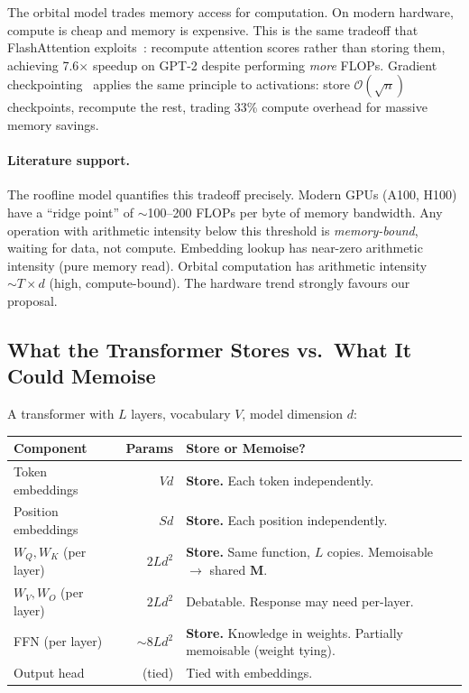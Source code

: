 \documentclass[11pt, a4paper]{article}
\newcommand{\M}{\mathbf{M}}
\theoremstyle{remark}
\begin{document}
The orbital model trades memory access for computation.
On modern hardware, compute is cheap and memory is expensive.
This is the same tradeoff that FlashAttention exploits~\cite{dao2022flashattention}: recompute attention scores rather than storing them, achieving 7.6$\times$ speedup on GPT-2 despite performing \emph{more} FLOPs.
Gradient checkpointing~\cite{chen2016sublinear} applies the same principle to activations: store $\mathcal{O}(\sqrt{n})$ checkpoints, recompute the rest, trading 33\% compute overhead for massive memory savings.

\paragraph{Literature support.}
The roofline model quantifies this tradeoff precisely.
Modern GPUs (A100, H100) have a ``ridge point'' of $\sim$100--200 FLOPs per byte of memory bandwidth.
Any operation with arithmetic intensity below this threshold is \emph{memory-bound}, waiting for data, not compute.
Embedding lookup has near-zero arithmetic intensity (pure memory read).
Orbital computation has arithmetic intensity $\sim T \times d$ (high, compute-bound).
The hardware trend strongly favours our proposal.

\subsection{What the Transformer Stores vs.\ What It Could Memoise}

A transformer with $L$ layers, vocabulary $V$, model dimension $d$:

\begin{center}\small
\begin{tabular}{@{}p{4.5cm}rp{6cm}@{}}
\toprule
\textbf{Component} & \textbf{Params} & \textbf{Store or Memoise?} \\
\midrule
Token embeddings & $Vd$ & \textbf{Store.} Each token independently. \\
Position embeddings & $Sd$ & \textbf{Store.} Each position independently. \\
$W_Q, W_K$ (per layer) & $2Ld^2$ & \textbf{Store.} Same function, $L$ copies. Memoisable $\to$ shared $\M$. \\
$W_V, W_O$ (per layer) & $2Ld^2$ & Debatable. Response may need per-layer. \\
FFN (per layer) & $\sim 8Ld^2$ & \textbf{Store.} Knowledge in weights. Partially memoisable (weight tying). \\
Output head & (tied) & Tied with embeddings. \\
\bottomrule
\end{tabular}
\end{center}
\end{document}
